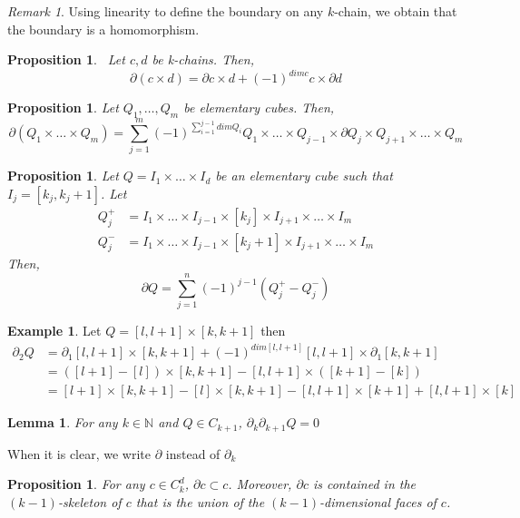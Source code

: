 \documentclass{article}
\newcommand{\N}{\mathbb{N}}
\theoremstyle{plain}
\newtheorem{lemma}[thm]{Lemma}
\newtheorem{prop}[thm]{Proposition}
\theoremstyle{definition}
\newtheorem{example}{Example}[section]
\theoremstyle{remark}
\newtheorem{remark}{Remark}[section]
\begin{document}
\begin{remark}
Using linearity to define the boundary on any $k$-chain, we obtain that the boundary is a homomorphism.
\end{remark}

\begin{prop}\ Let $c,d$ be k-chains. Then, \[ \partial(c \times d) = \partial c \times d + (-1)^{dim c} c \times \partial d \]
\end{prop}

\begin{prop}
Let $Q_1, \dots , Q_m$ be elementary cubes. Then, 
\[ \partial(Q_1 \times \dots \times Q_m) = \sum_{j=1}^m (-1)^{\sum_{i=1}^{j-1} dim Q_i} Q_1 \times \dots \times Q_{j-1} \times \partial Q_j \times Q_{j+1} \times \dots \times Q_m \]
\end{prop}

\begin{prop}
Let $Q= I_1 \times \dots \times I_d$ be an elementary cube such that $I_j = [k_j, k_j+1]$. Let 
\begin{align*}
Q^+_j &= I_1 \times \dots \times I_{j-1} \times [k_j] \times I_{j+1} \times \dots \times I_m \\
Q^-_j &= I_1 \times \dots \times I_{j-1} \times [k_j+1] \times I_{j+1} \times \dots \times I_m 
\end{align*}
Then, \[ \partial Q = \sum_{j=1}^n (-1)^{j-1} (Q^+_j - Q^-_j) \]
\end{prop}

\begin{example}
Let $Q=[l,l+1] \times [k,k+1]$ then 
\begin{align*}
    \partial_2 Q &= \partial_1 [l,l+1] \times [k,k+1] + (-1)^{dim [l,l+1]} [l,l+1] \times \partial_1 [k,k+1] \\ 
    &= ([l+1] - [l]) \times [k,k+1] - [l,l+1] \times ([k+1] - [k]) \\
    &= [l+1] \times [k,k+1] - [l] \times [k,k+1] - [l,l+1] \times [k+1] + [l,l+1] \times [k]
\end{align*}
\end{example}

\begin{lemma}
For any $k\in \N$ and $Q \in C_{k+1}$, $\partial_k \partial_{k+1} Q = 0$
\end{lemma}

When it is clear, we write $\partial$ instead of $\partial_k$

\begin{prop}
For any $c\in C^d_k$, $\partial c \subset c$. Moreover, $\partial c$ is contained in the $(k-1)$-skeleton of $c$ that is the union of the $(k-1)$-dimensional faces of $c$.
\end{prop}
\end{document}
